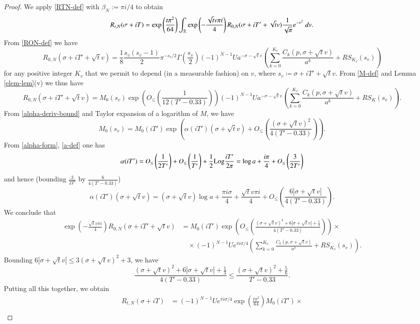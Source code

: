 \begin{proof}  We apply \eqref{RTN-def} with $\beta_N := \pi i/4$ to obtain
$$ R_{t,N}(\sigma+iT) = \exp\left( \frac{t \pi^2}{64}\right) \int_{\mathbb{R}} \exp\left( - \frac{\sqrt{t} v \pi i}{4}\right) R_{0,N}( \sigma+iT' + \sqrt{t} v) \frac{1}{\sqrt{\pi}} e^{-v^2}\ dv.$$
From \eqref{RON-def} we have
$$ R_{0,N}( \sigma+iT' + \sqrt{t} v) = \frac{1}{8} \frac{s_v(s_v-1)}{2} \pi^{-s_v/2} \Gamma\left(\frac{s_v}{2}\right) (-1)^{N-1} U a^{-\sigma-\sqrt{t} v}
\left(\sum_{k=0}^{K_v} \frac{C_k(p,\sigma + \sqrt{t} v)}{a^k} + RS_{K_v}(s_v)\right) $$
for any positive integer $K_v$ that we permit to depend (in a measurable fashion) on $v$, where $s_v \coloneqq \sigma + iT' + \sqrt{t} v$. From \eqref{M-def} and Lemma \ref{elem-lem}(v) we thus have
$$ R_{0,N}( \sigma+iT' + \sqrt{t} v) = M_0(s_v) \exp\left( O_{\leq}\left(\frac{1}{12(T'-0.33)}\right) \right) (-1)^{N-1} U a^{-\sigma-\sqrt{t} v}
\left(\sum_{k=0}^{K_v} \frac{C_k(p,\sigma + \sqrt{t} v)}{a^k} + RS_K(s_v)\right).$$
From \eqref{alpha-deriv-bound} and Taylor expansion of a logarithm of $M$, we have
$$ M_0(s_v) = M_0(iT') \exp\left( \alpha(iT') (\sigma + \sqrt{t} v) + O_{\leq}\left( \frac{(\sigma + \sqrt{t} v)^2}{4(T'-0.33)} \right) \right).$$
From \eqref{alpha-form}, \eqref{a-def} one has
$$ \alpha(iT') = O_{\leq}\left( \frac{1}{2T'}\right) + O_{\leq}\left( \frac{1}{T'}\right) + \frac{1}{2} {\operatorname{Log}} \frac{iT'}{2\pi} = \log a + \frac{i\pi}{4} + O_{\leq}\left( \frac{3}{2T'}\right)$$
and hence (bounding $\frac{3}{2T'}$ by $\frac{6}{4(T'-0.33)}$)
$$ \alpha(iT') (\sigma + \sqrt{t} v)  = (\sigma + \sqrt{t} v)  \log a + \frac{\pi i \sigma}{4} + \frac{\sqrt{t} v \pi i}{4} + O_{\leq}\left( \frac{6 |\sigma+\sqrt{t} v|}{4(T'-0.33)} \right).$$ 
We conclude that
\begin{align*}
\exp\left( - \frac{\sqrt{t} v \pi i}{4}\right) R_{0,N}( \sigma+iT' + \sqrt{t} v) &= 
M_0(iT') \exp\left( O_{\leq}\left(\frac{(\sigma + \sqrt{t} v)^2+6|\sigma+\sqrt{t} v|+\frac{1}{3}}{4(T'-0.33)} \right)\right) \times \\
&\quad \times (-1)^{N-1} U  e^{\pi i \sigma/4} \left(\sum_{k=0}^{K_v} \frac{C_k(p, \sigma+\sqrt{t} v)}{a^k} + RS_{K_v}(s_v)\right).
\end{align*}
Bounding $6|\sigma+\sqrt{t} v| \leq 3 (\sigma + \sqrt{t} v)^2 + 3$, we have
$$ \frac{(\sigma + \sqrt{t} v)^2+6|\sigma+\sqrt{t} v|+\frac{1}{3}}{4(T'-0.33)}  \leq \frac{(\sigma + \sqrt{t} v)^2 + \frac{5}{6}}{T'-0.33}.$$
Putting all this together, we obtain
\begin{align*}
 R_{t,N}(\sigma+iT) &= (-1)^{N-1} U e^{\pi i \sigma/4} \exp\left( \frac{t \pi^2}{64}\right) M_0(iT') \times \\

\end{align*}
\end{proof}

